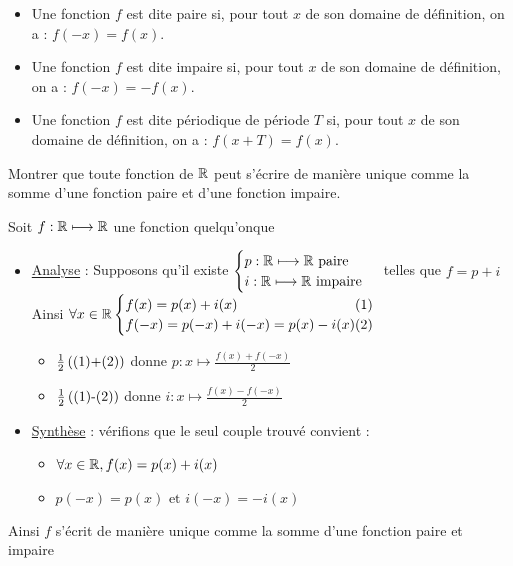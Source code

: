 \begin{defi}
	\begin{itemize}
		\item Une fonction \(f\) est dite paire si, pour tout \(x\) de son domaine de définition, on a : \(f(-x) = f(x)\).
		\item Une fonction \(f\) est dite impaire si, pour tout \(x\) de son domaine de définition, on a : \(f(-x) = -f(x)\).
		\item Une fonction \(f\) est dite périodique de période \(T\) si, pour tout \(x\) de son domaine de définition, on a : \(f(x+T) = f(x)\).
	\end{itemize}
\end{defi}
\begin{exo}
	Montrer que toute fonction de \(\mathbb{R}\) peut s'écrire de manière unique comme la somme d'une fonction paire et d'une fonction impaire.
\end{exo}

\begin{corr}
	Soit \(f : \mathbb{R} \longmapsto \mathbb{R} \) une fonction quelqu'onque
	\begin{itemize}
		\item \underline{Analyse} :  Supposons qu'il existe \(\begin{cases}
			      p:\mathbb{R} \longmapsto \mathbb{R} \text{ paire} \\
			      i:\mathbb{R} \longmapsto \mathbb{R} \text{ impaire}
		      \end{cases}\) telles que \(f = p + i\) \\
		      Ainsi \(\forall x \in \R \begin{cases}
			      f(x) = p(x) + i(x) \hfill (1)                  \\
			      f(-x) = p(-x) + i(-x) = p(x) - i(x) \hfill (2) \\
		      \end{cases}\) \\
		      \begin{itemize}
			      \item\(\frac{1}{2}\left(\text{(1)+(2)}\right)\) donne \(p:x\mapsto \frac{f(x)+f(-x)}{2}\) \\
			      \item \(\frac{1}{2}\left(\text{(1)-(2)}\right)\) donne \(i:x\mapsto \frac{f(x)-f(-x)}{2}\) \\
		      \end{itemize}
		\item \underline{Synthèse} : vérifions que le seul couple trouvé convient :
		      \begin{itemize}
			      \item \(\forall x \in \mathbb{R}, f(x) = p(x)+i(x)\)\\
			      \item \(p(-x) = p(x) \text{ et } i(-x) = -i(x)\)\\
		      \end{itemize}
	\end{itemize}
	Ainsi \(f\) s'écrit de manière unique comme la somme d'une fonction paire et impaire
\end{corr}

